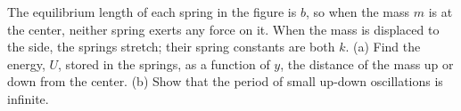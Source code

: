         The equilibrium length of each spring in the figure is $b$, so when the mass $m$ 
        is at the center, neither spring exerts any force on it. When the mass is
        displaced to the side, the springs stretch; their spring constants are both $k$.\hwendpart
        (a) Find the energy, $U$, stored in the springs, as a function of $y$, the distance
        of the mass up or down from the center.\answercheck\hwendpart
        (b) Show that the period of small up-down oscillations is infinite.
